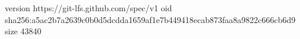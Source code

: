 version https://git-lfs.github.com/spec/v1
oid sha256:a5ac2b7a2639c0b0d5dcdda1659af1e7b449418ecab873faa8a9822c666cb6d9
size 43840
